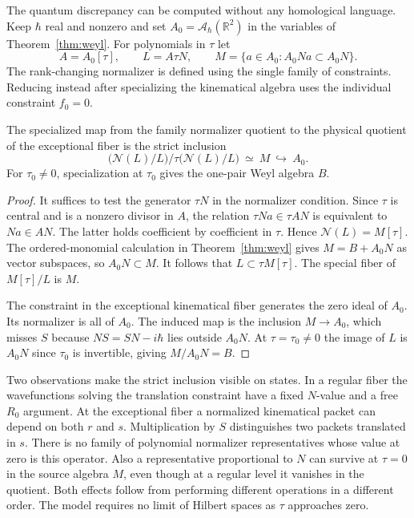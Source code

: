\documentclass[11pt,letterpaper]{article}
\newcommand{\cA}{\mathcal A}
\newcommand{\cN}{\mathcal N}
\newcommand{\RR}{\mathbb R}
\begin{document}
The quantum discrepancy can be computed without any homological language. Keep $\hbar$ real and
nonzero and set $A_0=\cA_\hbar(\RR^2)$ in the variables of Theorem~\ref{thm:weyl}. For
polynomials in $\tau$ let
\[
 A=A_0[\tau],\qquad L=A\tau N,\qquad
 M=\{a\in A_0:A_0N a\subset A_0N\}.
\]
The rank-changing normalizer is defined using the single family of constraints. Reducing
instead after specializing the kinematical algebra uses the individual constraint $f_0=0$.

\begin{proposition}\label{prop:basechange}
The specialized map from the family normalizer quotient to the physical quotient of the
exceptional fiber is the strict inclusion
\[
 \bigl(\cN(L)/L\bigr)\big/\tau\bigl(\cN(L)/L\bigr)
 \ \simeq\ M\ \hookrightarrow\ A_0.
\]
For $\tau_0\ne0$, specialization at $\tau_0$ gives the one-pair Weyl algebra $B$.
\end{proposition}
\begin{proof}
It suffices to test the generator $\tau N$ in the normalizer condition. Since $\tau$ is central
and is a nonzero divisor in $A$, the relation $\tau N a\in \tau A N$ is equivalent to $N a\in A
N$. The latter holds coefficient by coefficient in $\tau$. Hence $\cN(L)=M[\tau]$. The
ordered-monomial calculation in Theorem~\ref{thm:weyl} gives $M=B+A_0 N$ as vector subspaces,
so $A_0 N\subset M$. It follows that $L\subset \tau M[\tau]$. The special fiber of $M[\tau]/L$
is $M$.

The constraint in the exceptional kinematical fiber generates the zero ideal of $A_0$. Its
normalizer is all of $A_0$. The induced map is the inclusion $M\to A_0$, which misses $S$
because $NS=SN-i\hbar$ lies outside $A_0N$. At $\tau=\tau_0\ne0$ the image of $L$ is $A_0N$
since $\tau_0$ is invertible, giving $M/A_0N=B$.
\end{proof}

Two observations make the strict inclusion visible on states. In a regular fiber the
wavefunctions solving the translation constraint have a fixed $N$-value and a free $R_0$
argument. At the exceptional fiber a normalized kinematical packet can depend on both $r$ and
$s$. Multiplication by $S$ distinguishes two packets translated in $s$. There is no family of
polynomial normalizer representatives whose value at zero is this operator. Also a
representative proportional to $N$ can survive at $\tau=0$ in the source algebra $M$, even
though at a regular level it vanishes in the quotient. Both effects follow from performing
different operations in a different order. The model requires no limit of Hilbert spaces as
$\tau$ approaches zero.
\end{document}
